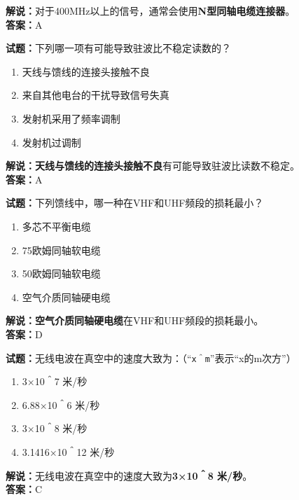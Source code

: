 \documentclass{ctexbook}
\begin{document}
\noindent\textbf{解说：}对于400MHz以上的信号，通常会使用\textbf{N型同轴电缆连接器}。\\\noindent\textbf{答案：}A


\bigskip


\noindent\textbf{试题：}下列哪一项有可能导致驻波比不稳定读数的？

\begin{enumerate}[leftmargin=3em]
	\item 天线与馈线的连接头接触不良
	\item 来自其他电台的干扰导致信号失真
	\item 发射机采用了频率调制
	\item 发射机过调制
\end{enumerate}

\noindent\textbf{解说：}\textbf{天线与馈线的连接头接触不良}有可能导致驻波比读数不稳定。\\\noindent\textbf{答案：}A


\bigskip


\noindent\textbf{试题：}下列馈线中，哪一种在VHF和UHF频段的损耗最小？

\begin{enumerate}[leftmargin=3em]
	\item 多芯不平衡电缆
	\item 75欧姆同轴软电缆
	\item 50欧姆同轴软电缆
	\item 空气介质同轴硬电缆
\end{enumerate}

\noindent\textbf{解说：}\textbf{空气介质同轴硬电缆}在VHF和UHF频段的损耗最小。\\\noindent\textbf{答案：}D


\bigskip


\noindent\textbf{试题：}无线电波在真空中的速度大致为：（“\texttt{x＾m}”表示“x的m次方”）

\begin{enumerate}[leftmargin=3em]
	\item 3×10＾7 米/秒
	\item 6.88×10＾6 米/秒
	\item 3×10＾8 米/秒
	\item 3.1416×10＾12 米/秒
\end{enumerate}

\noindent\textbf{解说：}无线电波在真空中的速度大致为\textbf{3×10＾8 米/秒}。\\\noindent\textbf{答案：}C


\bigskip
\end{document}
